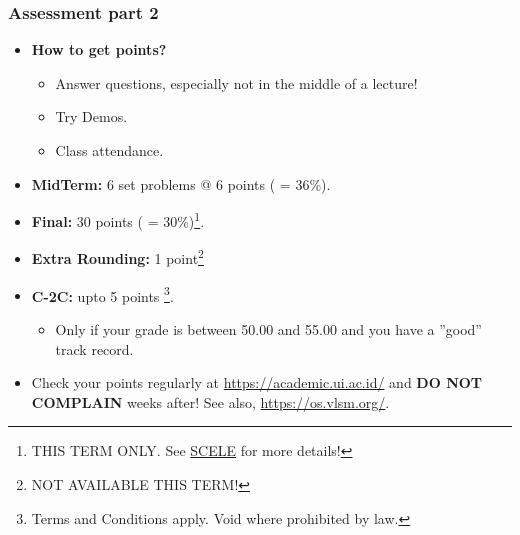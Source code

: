 \documentclass[xcolor=table, notheorems, hyperref={pdfpagelabels=false}]{beamer}
\begin{document}
\begin{frame}
\frametitle{Assessment part 2}

\begin{itemize}
\item \textbf{How to get points?}
\begin{itemize}
\item Answer questions, especially not in the middle of a lecture!
\item Try Demos.
\item Class attendance.
\end{itemize}
\item \textbf{MidTerm:} 6 set problems @ 6 points ( = 36\%).
\item \textbf{Final:} 30 points ( = 30\%)\footnote{THIS
       TERM ONLY. See
       \href{https://scele.cs.ui.ac.id/course/view.php?id=822}{SCELE}
       for more details!}.  \\
\item \textbf{Extra Rounding:} 1
       point\footnote{NOT AVAILABLE THIS TERM!}  \\
\item \textbf{C-2C:} upto 5 points \footnote{Terms
      and Conditions apply. Void where prohibited by law.}. \\
\begin{itemize}
\item Only if your grade is between 50.00 and 55.00 and you have a ''good'' track record.
\end{itemize}
\item Check your points regularly at \url{https://academic.ui.ac.id/} and
      \textbf{DO NOT COMPLAIN} weeks after! See also, \url{https://os.vlsm.org/}.
\end{itemize}

\end{frame}


\end{document}
